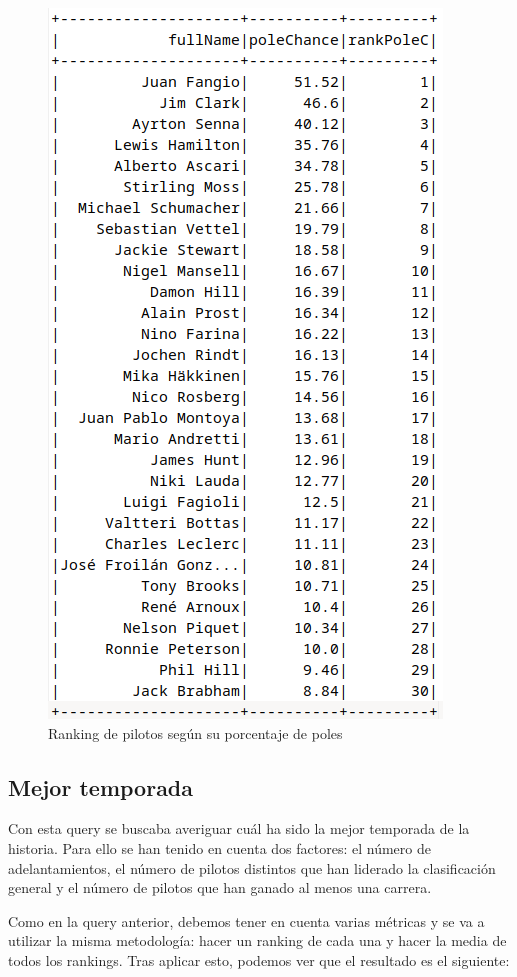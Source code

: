 \documentclass[12pt,twoside,titlepage]{report}
\begin{document}
\begin{figure}[H]
	\includegraphics[scale=0.3]{results/bestdrivers/polechance.png}
	\centering
	\caption{Ranking de pilotos según su porcentaje de poles}
	\label{fig:poleChance}
	\centering
\end{figure}

\subsection{Mejor temporada}

Con esta query se buscaba averiguar cuál ha sido la mejor temporada de la historia. Para ello se han tenido en cuenta dos factores: el número de adelantamientos, el número de pilotos distintos que han liderado la clasificación general y el número de pilotos que han ganado al menos una carrera.

Como en la query anterior, debemos tener en cuenta varias métricas y se va a utilizar la misma metodología: hacer un ranking de cada una y hacer la media de todos los rankings. Tras aplicar esto, podemos ver que el resultado es el siguiente:
\end{document}
